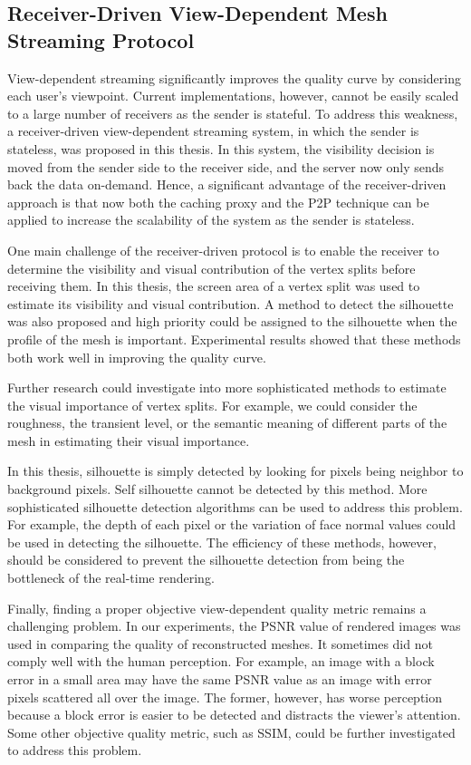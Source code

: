 \subsection{Receiver-Driven View-Dependent Mesh Streaming Protocol}
View-dependent streaming significantly improves the quality curve
by considering each user's viewpoint.
Current implementations, however, 
cannot be easily scaled to a large number of receivers as the sender is stateful. 
To address this weakness, a receiver-driven view-dependent streaming system,
in which the sender is stateless, was proposed in this thesis. 
In this system, the visibility decision is moved from the sender side 
to the receiver side, and the server now only sends back the data on-demand.
Hence, a significant advantage of the receiver-driven approach is that
now both the caching proxy and the P2P technique can be applied
to increase the scalability of the system as the sender is stateless. 

One main challenge of the receiver-driven protocol is to enable the receiver
to determine the visibility and visual contribution of the vertex splits 
before receiving them.
In this thesis, the screen area of a vertex split was used 
to estimate its visibility and visual contribution. 
A method to detect the silhouette was also proposed and 
high priority could be assigned to the silhouette when the
profile of the mesh is important. 
Experimental results showed that these methods both work well 
in improving the quality curve. 

Further research could investigate into more sophisticated methods
to estimate the visual importance of vertex splits.
For example, we could consider the roughness, the transient level,
or the semantic meaning of different parts of the mesh in estimating
their visual importance. 


In this thesis, silhouette is simply
detected by looking for pixels being neighbor to background pixels. 
Self silhouette cannot be detected by this method. 
More sophisticated silhouette detection algorithms can be used to address this problem.
For example, the depth of each pixel or the variation of face normal values
could be used in detecting the silhouette. 
The efficiency of these methods, however, should be considered to prevent
the silhouette detection from being the bottleneck of the real-time rendering.

Finally, finding a proper objective view-dependent quality metric 
remains a challenging problem.
In our experiments, the PSNR value of rendered images was used in 
comparing the quality of reconstructed meshes. 
It sometimes did not comply well with the human perception. For example, 
an image with a block error in a small area may have the same PSNR value as an image
with error pixels scattered all over the image. 
The former, however, has worse perception because a block
error is easier to be detected and distracts the viewer's attention. 
Some other objective quality metric, such as SSIM, could be further
investigated to address this problem. 

